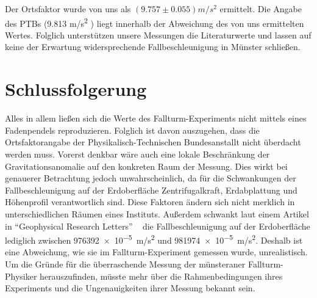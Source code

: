 \documentclass[
	a4paper,
	12pt,
	pagesize,
	ngerman
]{scrartcl}
\begin{document}
	
	Der Ortsfaktor wurde von uns als $(9.757 \pm 0.055) \si{m/s^2}$ ermittelt. Die Angabe des PTBs (9.813 \si{m/s^2} ) liegt innerhalb der Abweichung des von uns ermittelten Wertes. Folglich unterstützen unsere Messungen die Literaturwerte und lassen auf keine der Erwartung widersprechende Fallbeschleunigung in Münster schließen.

	\section{Schlussfolgerung}
	Alles in allem ließen sich die Werte des Fallturm-Experiments nicht mittels eines Fadenpendels reproduzieren. Folglich ist davon auszugehen, dass die Ortsfaktorangabe der Physikalisch-Technischen Bundesanstallt nicht überdacht werden muss. Vorerst denkbar wäre auch eine lokale Beschränkung der Gravitationsanomalie auf den konkreten Raum der Messung. Dies wirkt bei genauerer Betrachtung jedoch unwahrscheinlich, da für die Schwankungen der Fallbeschleunigung auf der Erdoberfläche Zentrifugalkraft, Erdabplattung und Höhenprofil verantwortlich sind. Diese Faktoren ändern sich nicht merklich in unterschiedlichen Räumen eines Instituts. Außerdem schwankt laut einem Artikel in \enquote{Geophysical Research Letters} ~\cite{Fall} die Fallbeschleunigung auf der Erdoberfläche lediglich zwischen \SI{976392e-5}{m/s^2} und \SI{981974e-5}{m/s^2}. %
	 Deshalb ist eine Abweichung, wie sie im Fallturm-Experiment gemessen wurde, unrealistisch.  Um die Gründe für die überraschende Messung der münsteraner Fallturm-Physiker herauszufinden, müsste mehr über die Rahmenbedingungen ihres Experiments und die Ungenauigkeiten ihrer Messung bekannt sein.



	\printbibliography
\end{document}
